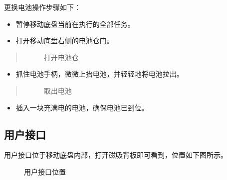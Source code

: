 \documentclass[a4paper,11pt,english,openany,oneside]{sphinxmanual}
\begin{document}
\sphinxAtStartPar
更换电池操作步骤如下：
\begin{itemize}
\item {} 
\sphinxAtStartPar
暂停移动底盘当前在执行的全部任务。

\item {} 
\sphinxAtStartPar
打开移动底盘右侧的电池仓门。

\end{itemize}
\begin{quote}

\begin{figure}[H]
\centering
\capstart

\noindent{}
\caption{打开电池仓}\label{\detokenize{08 _u5b89_u88c5_u4e0e_u8c03_u8bd5:id53}}\end{figure}
\end{quote}
\begin{itemize}
\item {} 
\sphinxAtStartPar
抓住电池手柄，微微上抬电池，并轻轻地将电池拉出。

\end{itemize}
\begin{quote}

\begin{figure}[H]
\centering
\capstart

\noindent{}
\caption{取出电池}\label{\detokenize{08 _u5b89_u88c5_u4e0e_u8c03_u8bd5:id54}}\end{figure}
\end{quote}
\begin{itemize}
\item {} 
\sphinxAtStartPar
插入一块充满电的电池，确保电池已到位。

\end{itemize}


\subsection{用户接口}
\label{\detokenize{08 _u5b89_u88c5_u4e0e_u8c03_u8bd5:id25}}\label{\detokenize{08 _u5b89_u88c5_u4e0e_u8c03_u8bd5:id26}}
\sphinxAtStartPar
用户接口位于移动底盘内部，打开磁吸背板即可看到，位置如下图所示。

\begin{figure}[H]
\centering
\capstart

\noindent{}
\caption{用户接口位置}\label{\detokenize{08 _u5b89_u88c5_u4e0e_u8c03_u8bd5:id55}}\end{figure}
\end{document}
